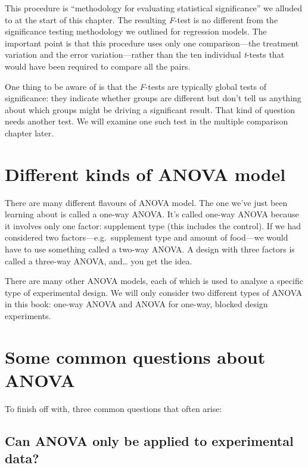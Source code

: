 \documentclass[
]{book}
\begin{document}
This procedure is ``methodology for evaluating statistical significance'' we alluded to at the start of this chapter. The resulting \emph{F}-test is no different from the significance testing methodology we outlined for regression models. The important point is that this procedure uses only one comparison---the treatment variation and the error variation---rather than the ten individual \emph{t}-tests that would have been required to compare all the pairs.

One thing to be aware of is that the \emph{F}-tests are typically global tests of significance: they indicate whether groups are different but don't tell us anything about which groups might be driving a significant result. That kind of question needs another test. We will examine one such test in the multiple comparison chapter later.

\hypertarget{different-kinds-of-anova-model}{%
\section{Different kinds of ANOVA model}\label{different-kinds-of-anova-model}}

There are many different flavours of ANOVA model. The one we've just been learning about is called a one-way ANOVA. It's called one-way ANOVA because it involves only one factor: supplement type (this includes the control). If we had considered two factors---e.g.~supplement type and amount of food---we would have to use something called a two-way ANOVA. A design with three factors is called a three-way ANOVA, and\ldots{} you get the idea.

There are many other ANOVA models, each of which is used to analyse a specific type of experimental design. We will only consider two different types of ANOVA in this book: one-way ANOVA and ANOVA for one-way, blocked design experiments.

\hypertarget{questions}{%
\section{Some common questions about ANOVA}\label{questions}}

To finish off with, three common questions that often arise:

\hypertarget{can-anova-only-be-applied-to-experimental-data}{%
\subsection{Can ANOVA only be applied to experimental data?}\label{can-anova-only-be-applied-to-experimental-data}}
\end{document}
